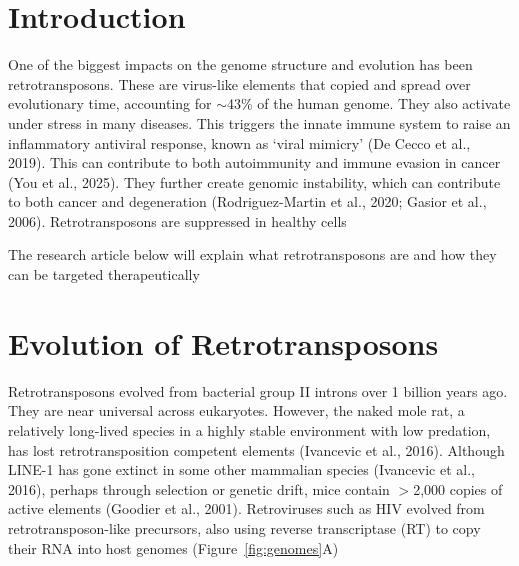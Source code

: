 \documentclass[11pt,twocolumn,twoside]{extarticle}
\begin{document}
\section{Introduction}
One of the biggest impacts on the genome structure and evolution has been retrotransposons. These are virus-like elements that copied and spread over evolutionary time, accounting for $\sim$43\% of the human genome. They also activate under stress in many diseases. This triggers the innate immune system to raise an inflammatory antiviral response, known as `viral mimicry' (De Cecco et al., 2019). This can contribute to both autoimmunity and immune evasion in cancer (You et al., 2025). They further create genomic instability, which can contribute to both cancer and degeneration (Rodriguez-Martin et al., 2020; Gasior et al., 2006). Retrotransposons are suppressed in healthy cells

The research article below will explain what retrotransposons are and how they can be targeted therapeutically

\section{Evolution of Retrotransposons}
Retrotransposons evolved from bacterial group II introns over 1 billion years ago. They are near universal across eukaryotes. However, the naked mole rat, a relatively long-lived species in a highly stable environment with low predation, has lost retrotransposition competent elements (Ivancevic et al., 2016). Although LINE-1 has gone extinct in some other mammalian species (Ivancevic et al., 2016), perhaps through selection or genetic drift, mice contain $>$2,000 copies of active elements (Goodier et al., 2001). Retroviruses such as HIV evolved from retrotransposon-like precursors, also using reverse transcriptase (RT) to copy their RNA into host genomes (Figure~\ref{fig:genomes}A)
\end{document}
